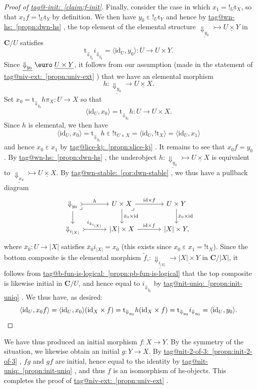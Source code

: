 \documentclass{amsart}
\makeatletter
\newcommand\abs[2][]{#1\lvert{#2}#1\rvert}
\newcommand\bC{\mathbf{C}}
\newcommand\br[1]{\langle{}#1\rangle{}}
\newcommand\Dwn{{\Downarrow}}
\newcommand\Ein{\mathrel{\text{\textup{\euro}}}}
\newcommand\ein{\mathrel{\varepsilon}}
\newcommand\id{\mathrm{id}}
\newcommand\pb[1][rd]{\ar[#1, phantom, "\lrcorner", pos=0]}
\newcommand\rt{\mathrm{t}}
\newcommand\tto{\rightarrowtail}
\newcommand\und[1]{\underline{#1}}
\newcommand\unex{{!}}
\newcommand\tagword[1]{\csname tag@#1\endcsname}
\def\label@tag#1:#2\@nil{#1}
\newcommand\labeltag[1]{\label@tag#1:\@nil}
\newcommand\jref[1]{%
  \texorpdfstring%
    {\hyperref[#1]{\tagword{\labeltag{#1}}~\ref*{#1}}}%
    {\tagword{\labeltag{#1}}~\ref*{#1}}%
}
\theoremstyle{definition}
\theoremstyle{remark}
\theoremstyle{plainwithref}
\makeatother
\begin{document}
\begin{proof}[Proof of \jref{claim:f-init}]
  Finally, consider the case in which \( x_1 = \unex_{U} \rt_X \), so that \( x_1 f = \unex_{U} \rt_Y \) by definition.
  We then have \( y_0 \ein \unex_{U} \rt_Y \) and hence by \jref{propn:dwn-hs}, the top element of the elemental structure \( \und{\Dwn_{y_0}} \tto \und{U \times Y} \) in \( \bC / U \) satisfies
  \[
    \rt_{\Dwn_{y_0}} i_{\Dwn_{y_0}} = \br{\id_U, y_0} \colon U \to U \times Y.
  \]
  Since \( \und{\Dwn_{y_0}} \Ein \und{U \times Y} \), it follows from our assumption (made in the statement of \jref{propn:univ-ext}) that we have an elemental morphism
  \[
    h \colon \und{\Dwn_{y_0}} \to \und{U \times X}.
  \]
  Set \( x_0 = \rt_{\Dwn_{y_0}} h \pi_X \colon U \to X \) so that
  \[
    \br{\id_U, x_0} = \rt_{\Dwn_{y_0}} h \colon U \to U \times X.
  \]
  Since \( h \) is elemental, we then have
  \[
    \br{\id_U, x_0} = \rt_{\Dwn_{y_0}} h \ein \unex \rt_{U \times X} = \br{\id_{U}, \unex \rt_X} = \br{\id_{U}, x_1}
  \]
  and hence \( x_0 \ein x_1 \) by \jref{propn:slice-kj}.
  It remains to see that \( x_0 f = y_0 \).
  By \jref{propn:dwn-hs}, the underobject \( h \colon \und{\Dwn_{y_0}} \tto \und{U \times X} \) is equivalent to \( \und{\Dwn_{x_0}} \tto \und{U \times X} \).
  By \jref{cor:dwn-stable}, we thus have a pullback diagram
  \[
    \begin{tikzcd}
      \Dwn_{y_0} \pb \ar[r, "h", >->] \ar[d] &[10pt] \pb U \times X \ar[r, "\id \times f"] \ar[d, "\bar x_0 \times \id"] &[10pt] U \times Y \ar[d, "\bar x_0 \times \id"] \\
      \Dwn_{i_{\abs X}} \ar[r, "i_{\Dwn_{i_{\abs X}}}", >->] & \abs X \times X \ar[r, "\id \times f"] & \abs X \times Y,
    \end{tikzcd}
  \]
  where \( \bar x_0 \colon U \to \abs{X} \) satisfies \( \bar x_0 i_{\abs X} = x_0 \) (this exists since \( x_0 \ein x_1 = \unex \rt_X \)).
  Since the bottom composite is the elemental morphism \( \tilde f_\circ \colon \und{\Dwn_{i_{\abs X}}} \to \und{\abs X \times Y} \) in \( \bC / \abs X \), it follows from \jref{propn:pb-fun-is-logical} that the top composite is likewise initial in \( \bC / U \), and hence equal to \( i_{\Dwn_{y_0}} \) by \jref{propn:init-uniq}.
  We thus have, as desired:
  \[
    \br{\id_U, x_0 f}
    = \br{\id_U, x_0} (\id_X \times f)
    = \rt_{\Dwn_{y_0}} h (\id_X \times f)
    = \rt_{\Dwn_{y_0}} i_{\Dwn_{y_0}}
    = \br{\id_U, y_0}.
    \qedhere
  \]
\end{proof}

We have thus produced an initial morphism \( f \colon X \to Y \).
By the symmetry of the situation, we likewise obtain an initial \( g \colon Y \to X \).
By \jref{propn:init-2-of-3}, \( f g \) and \( g f \) are initial, hence equal to the identity by \jref{propn:init-uniq}, and thus \( f \) is an isomorphism of hs-objects.
This completes the proof of \jref{propn:univ-ext}.
\end{document}
